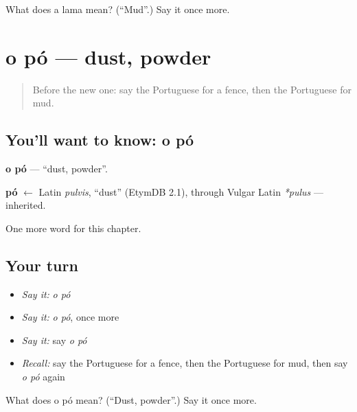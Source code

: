\begin{tcolorbox}[breakable,colback=teal!4,colframe=teal!35!black,title={Before you move on}]
What does a lama mean? (\textquotedblleft{}Mud\textquotedblright{}.) Say it once more.
\end{tcolorbox}
\section[o pó]{o pó — dust, powder}

\label{lesson:PT-C195-po}



\begin{quote}
Before the new one: say the Portuguese for a fence, then the Portuguese for mud.
\end{quote}

\subsection*{You'll want to know: o pó}
\textbf{o pó} — \textquotedblleft{}dust, powder\textquotedblright{}.

\begin{cousinweb}
\textbf{pó} $\leftarrow$ Latin \emph{pulvis}, \textquotedblleft{}dust\textquotedblright{} (EtymDB 2.1), through Vulgar Latin \emph{*pulus} — inherited.
\end{cousinweb}

\begin{grammarlens}[title={What you've built}]
One more word for this chapter.
\end{grammarlens}

\subsection*{Your turn}
\begin{itemize}
\raggedright
  \item \emph{Say it:} \emph{o pó}
  \item \emph{Say it:} \emph{o pó}, once more
  \item \emph{Say it:} say \emph{o pó}
  \item \emph{Recall:} say the Portuguese for a fence, then the Portuguese for mud, then say \emph{o pó} again
\end{itemize}

\begin{tcolorbox}[breakable,colback=teal!4,colframe=teal!35!black,title={Before you move on}]
What does o pó mean? (\textquotedblleft{}Dust, powder\textquotedblright{}.) Say it once more.
\end{tcolorbox}
